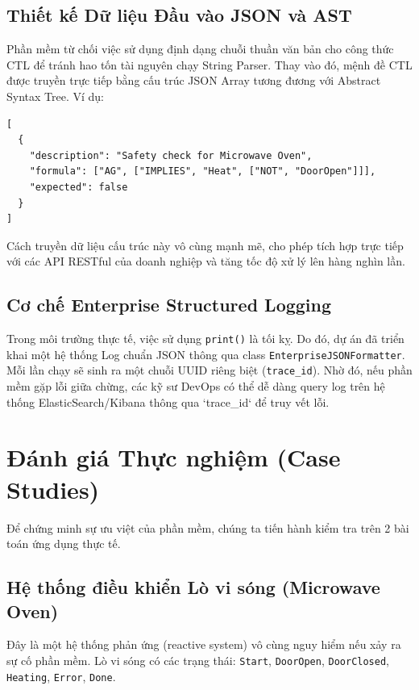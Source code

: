 \documentclass[12pt,a4paper]{article}
\begin{document}
\subsection{Thiết kế Dữ liệu Đầu vào JSON và AST}
Phần mềm từ chối việc sử dụng định dạng chuỗi thuần văn bản cho công thức CTL để tránh hao tốn tài nguyên chạy String Parser. Thay vào đó, mệnh đề CTL được truyền trực tiếp bằng cấu trúc JSON Array tương đương với Abstract Syntax Tree.
Ví dụ:
\begin{lstlisting}[caption=Ví dụ định dạng đầu vào test\_formulas.json]
[
  {
    "description": "Safety check for Microwave Oven",
    "formula": ["AG", ["IMPLIES", "Heat", ["NOT", "DoorOpen"]]],
    "expected": false
  }
]
\end{lstlisting}
Cách truyền dữ liệu cấu trúc này vô cùng mạnh mẽ, cho phép tích hợp trực tiếp với các API RESTful của doanh nghiệp và tăng tốc độ xử lý lên hàng nghìn lần.

\subsection{Cơ chế Enterprise Structured Logging}
Trong môi trường thực tế, việc sử dụng \texttt{print()} là tối kỵ. Do đó, dự án đã triển khai một hệ thống Log chuẩn JSON thông qua class \texttt{EnterpriseJSONFormatter}. 
Mỗi lần chạy sẽ sinh ra một chuỗi UUID riêng biệt (\texttt{trace\_id}). Nhờ đó, nếu phần mềm gặp lỗi giữa chừng, các kỹ sư DevOps có thể dễ dàng query log trên hệ thống ElasticSearch/Kibana thông qua `trace\_id` để truy vết lỗi.

\newpage
\section{Đánh giá Thực nghiệm (Case Studies)}
Để chứng minh sự ưu việt của phần mềm, chúng ta tiến hành kiểm tra trên 2 bài toán ứng dụng thực tế.

\subsection{Hệ thống điều khiển Lò vi sóng (Microwave Oven)}
Đây là một hệ thống phản ứng (reactive system) vô cùng nguy hiểm nếu xảy ra sự cố phần mềm. 
Lò vi sóng có các trạng thái: \texttt{Start}, \texttt{DoorOpen}, \texttt{DoorClosed}, \texttt{Heating}, \texttt{Error}, \texttt{Done}.
\end{document}

